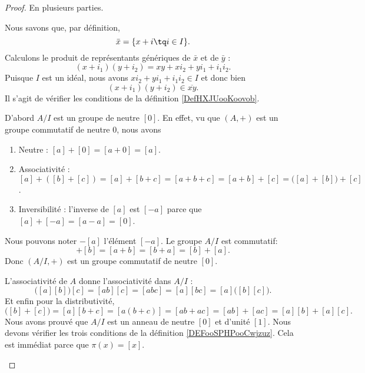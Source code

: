 \begin{proof}
	En plusieurs parties.
	\begin{subproof}
		Nous savons que, par définition,
		\begin{equation}
			\bar x=\{ x+i\tq i\in I \}.
		\end{equation}
		Calculons le produit de représentants génériques de \( \bar x\) et de \( \bar y\) :
		\begin{equation}
			(x+i_1)(y+i_2)=xy+xi_2+yi_1+i_1i_2.
		\end{equation}
		Puisque \( I\) est un idéal, nous avons \( xi_2+yi_1+i_1i_2\in I\) et donc bien
		\begin{equation}
			(x+i_1)(y+i_2)\in \overline{ xy }.
		\end{equation}
		Il s'agit de vérifier les conditions de la définition \ref{DefHXJUooKoovob}.

		D'abord \( A/I\) est un groupe de neutre \( [0]\). En effet, vu que \( (A,+)\) est un groupe commutatif de neutre \( 0\), nous avons
		\begin{enumerate}
			\item Neutre : $[a]+[0]=[a+0]=[a]$.
			\item Associativité :
			      $[a]+([b]+[c])=[a]+[b+c]=[a+b+c]=[a+b]+[c]=\big( [a]+[b] \big)+[c]$.
			\item Inversibilité : l'inverse de \( [a]\) est \( [-a]\) parce que \( [a]+[-a]= [a-a]=[0] \).
		\end{enumerate}
		Nous pouvons noter \( -[a]\) l'élément \( [-a]\). Le groupe \( A/I\) est commutatif:
		\begin{equation}
			[a]+[b]=[a+b]=[b+a]=[b]+[a].
		\end{equation}
		Donc \( (A/I,+)\) est un groupe commutatif de neutre \( [0]\).

		L'associativité de \( A\) donne l'associativité dans \( A/I\) :
		\begin{equation}
			\big( [a][b] \big)[c]=[ab][c]=[abc]=[a][bc]=[a]\big( [b][c] \big).
		\end{equation}
		Et enfin pour la distributivité,
		\begin{equation}
			[a]\big( [b]+[c] \big)=[a][b+c]=[a(b+c)]=[ab+ac]=[ab]+[ac]=[a][b]+[a][c].
		\end{equation}
		Nous avons prouvé que \( A/I\) est un anneau de neutre \( [0]\) et d'unité \( [1]\).
		Nous devons vérifier les trois conditions de la définition \ref{DEFooSPHPooCwjzuz}. Cela est immédiat parce que \( \pi(x)=[x]\).
	\end{subproof}
\end{proof}

